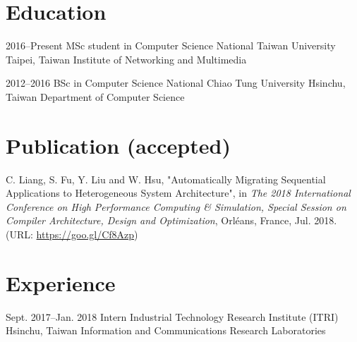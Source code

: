 \documentclass[11pt,a4paper,sans,english]{moderncv}
\begin{document}
\makecvtitle

\section{Education}
    \cventry
        {2016--Present} %
        {MSc student in Computer Science} %
        {National Taiwan University} %
        {Taipei, Taiwan} %
        {Institute of Networking and Multimedia} %
        {}

    \cventry
        {2012--2016}
        {BSc in Computer Science}
        {National Chiao Tung University}
        {Hsinchu, Taiwan}
        {Department of Computer Science}
        {%
        }
        
\section{Publication (accepted)}
    C. Liang, S. Fu, Y. Liu and W. Hsu, "Automatically Migrating Sequential Applications to Heterogeneous System Architecture", in \textit{The 2018 International Conference on High Performance Computing \& Simulation, Special Session on Compiler Architecture, Design and Optimization}, Orléans, France, Jul. 2018. (URL: \href{https://goo.gl/Cf8Azp}{https://goo.gl/Cf8Azp})
    

\section{Experience}
    \cventry
        {Sept. 2017--Jan. 2018} %
        {Intern} %
        {Industrial Technology Research Institute (ITRI)} %
        {Hsinchu, Taiwan} %
        {Information and Communications Research Laboratories} %
        {} %
\end{document}
